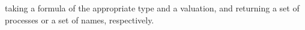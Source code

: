 \documentclass[]{acm_proc_article-sp}
\makeatletter
\newcommand{\ldb}{[\![}
\newcommand{\rdb}{]\!]}
\newcommand{\ldrb}{(\!(}
\newcommand{\rdrb}{)\!)}
\newcommand{\lpquote}{\ulcorner}
\newcommand{\rpquote}{\urcorner}
\newcommand{\id}[1]{\texttt{#1}}
\newcommand{\pzero}{\mathbin{0}}
\newcommand{\juxtap}{\mathbin{\id{|}}}
\newcommand{\concat}{\Rightarrow}
\newcommand{\scong}{\mathbin{\equiv}}
\newcommand{\nameeq}{\mathbin{\equiv_N}}
\newcommand{\binpar}[2]{#1 \juxtap #2}
\newcommand{\prefix}[3]{#1 ? ( #2 ) \concat #3}
\newcommand{\lift}[2]{#1 ! ( #2 )}
\newcommand{\quotep}[1]{@#1}
\newcommand{\dropn}[1]{*#1}
\newcommand{\substn}[2]{\id{\{} #1 / #2 \id{\}}}
\newcommand{\pmeaningof}[1]{\ldb #1 \rdb}
\newcommand{\nmeaningof}[1]{\ldrb #1 \rdrb}
\newcommand{\Proc}{\mathbin{Proc}}
\newcommand{\ptrue}{\mathbin{true}}
\newcommand{\pdropf}[1]{\rpquote #1 \lpquote}
\newcommand{\pquotep}[1]{\lpquote #1 \rpquote}
\newcommand{\plift}[2]{#1 ! ( #2 )}
\newcommand{\pprefix}[3]{\langle #1 ? #2 \rangle #3}
\newcommand{\pgfp}[2]{\textsf{rec} \; #1 \mathbin{.} #2}
\newcommand{\pquant}[3]{\forall #1 \mathbin{:} #2 \mathbin{.} #3}
\numberwithin{equation}{subsection}
\makeatother
\begin{document}
\noindent taking a formula of the appropriate type and a valuation, and
returning a set of processes or a set of names, respectively.

\end{document}

